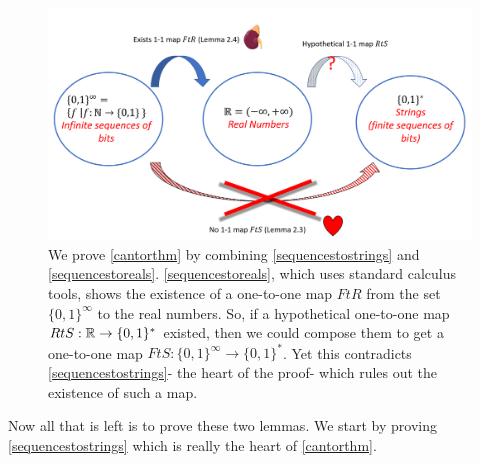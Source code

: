 \begin{figure}
\centering
\includegraphics[width=\textwidth, height=0.25\paperheight, keepaspectratio]{../figure/proofofcantor.png}
\caption{We prove \cref{cantorthm} by combining
\cref{sequencestostrings} and \cref{sequencestoreals}.
\cref{sequencestoreals}, which uses standard calculus tools, shows the
existence of a one-to-one map \(FtR\) from the set \(\{0,1\}^\infty\) to
the real numbers. So, if a hypothetical one-to-one map
\(RtS:{\mathbb{R}} \rightarrow \{0,1\}^*\) existed, then we could compose them to
get a one-to-one map \(FtS:\{0,1\}^\infty \rightarrow \{0,1\}^*\). Yet
this contradicts \cref{sequencestostrings}- the heart of the proof-
which rules out the existence of such a map.}
\label{proofofcantorfig}
\end{figure}

Now all that is left is to prove these two lemmas. We start by proving
\cref{sequencestostrings} which is really the heart of \cref{cantorthm}.


